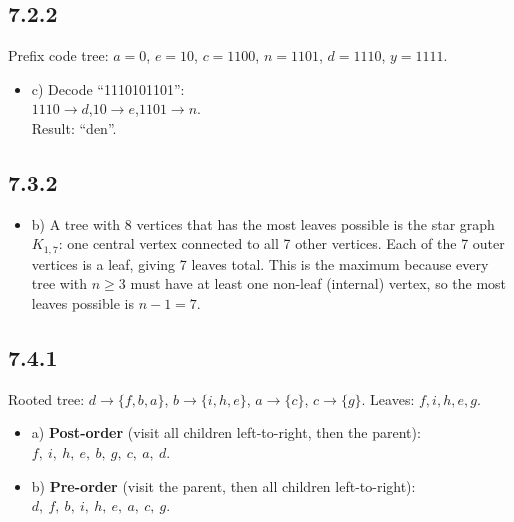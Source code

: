 \documentclass{article}
\begin{document}
\subsection*{7.2.2}
Prefix code tree: $a = 0$, $e = 10$, $c = 1100$, $n = 1101$, $d = 1110$, $y = 1111$.
\begin{itemize}
    \item c) Decode ``1110101101'':\\
    $1110 \to d$,\quad $10 \to e$,\quad $1101 \to n$.\\
    Result: ``den''.
\end{itemize}

\subsection*{7.3.2}
\begin{itemize}
    \item b) A tree with 8 vertices that has the most leaves possible is the star graph $K_{1,7}$: one central vertex connected to all 7 other vertices. Each of the 7 outer vertices is a leaf, giving 7 leaves total. This is the maximum because every tree with $n \ge 3$ must have at least one non-leaf (internal) vertex, so the most leaves possible is $n - 1 = 7$.
\end{itemize}

\subsection*{7.4.1}
Rooted tree: $d \to \{f,b,a\}$, $b \to \{i,h,e\}$, $a \to \{c\}$, $c \to \{g\}$. Leaves: $f,i,h,e,g$.
\begin{itemize}
    \item a) \textbf{Post-order} (visit all children left-to-right, then the parent):\\
    $f,\ i,\ h,\ e,\ b,\ g,\ c,\ a,\ d$.

    \item b) \textbf{Pre-order} (visit the parent, then all children left-to-right):\\
    $d,\ f,\ b,\ i,\ h,\ e,\ a,\ c,\ g$.
\end{itemize}
\end{document}
